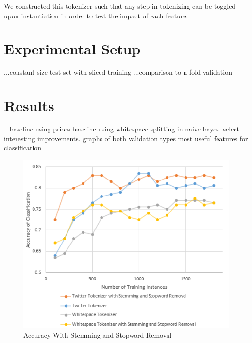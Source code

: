 \documentclass[letterpaper]{article}
\begin{document}
We constructed this tokenizer such that any step in tokenizing can be toggled upon instantiation in order to test the impact of each feature.\\

\section{Experimental Setup}
...constant-size test set with sliced training
...comparison to n-fold validation


\section{Results}

...baseline using priors
  baseline using whitespace splitting in naive bayes.
  select interesting improvements.
  graphs of both validation types
  most useful features for classification

\begin{figure}[ht]
\centering
\includegraphics[width=\linewidth]{chart_twitterVSwhitespace}
\caption{Accuracy With Stemming and Stopword Removal}
\label{fig:chart_twitterwhitespace}
\end{figure}
\end{document}
